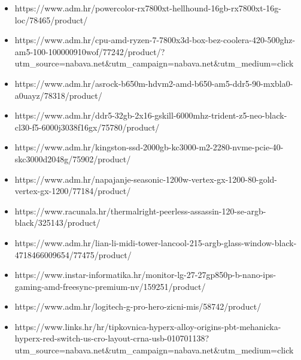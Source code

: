\documentclass{article}
\begin{document}
\begin{itemize}
    \item https://www.adm.hr/powercolor-rx7800xt-hellhound-16gb-rx7800xt-16g-loc/78465/product/
    
    \item https://www.adm.hr/cpu-amd-ryzen-7-7800x3d-box-bez-coolera-420-500ghz-am5-100-100000910wof/77242/product/?utm\_source=nabava.net\&utm\_campaign=nabava.net\-\&utm\_medium=click
    
    \item https://www.adm.hr/asrock-b650m-hdvm2-amd-b650-am5-ddr5-90-mxbla0-a0uayz/78318/product/

    \item https://www.adm.hr/ddr5-32gb-2x16-gskill-6000mhz-trident-z5-neo-black-cl30-f5-6000j3038f16gx/75780/product/

    \item https://www.adm.hr/kingston-ssd-2000gb-kc3000-m2-2280-nvme-pcie-40-skc3000d2048g/75902/product/

    \item https://www.adm.hr/napajanje-seasonic-1200w-vertex-gx-1200-80-gold-vertex-gx-1200/77184/product/

    \item https://www.racunala.hr/thermalright-peerless-assassin-120-se-argb-black/325143/product/

    \item https://www.adm.hr/lian-li-midi-tower-lancool-215-argb-glass-window-black-4718466009654/77475/product/

    \item https://www.instar-informatika.hr/monitor-lg-27-27gp850p-b-nano-ips-gaming-amd-freesync-premium-nv/159251/product/

    \item https://www.adm.hr/logitech-g-pro-hero-zicni-mis/58742/product/

    \item https://www.links.hr/hr/tipkovnica-hyperx-alloy-origins-pbt-mehanicka-hyperx-red-switch-us-cro-layout-crna-usb-010701138?utm\_source=nabava.net\&utm\_campaign\-=nabava.net\&utm\_medium=click

    
\end{itemize}
\end{document}
